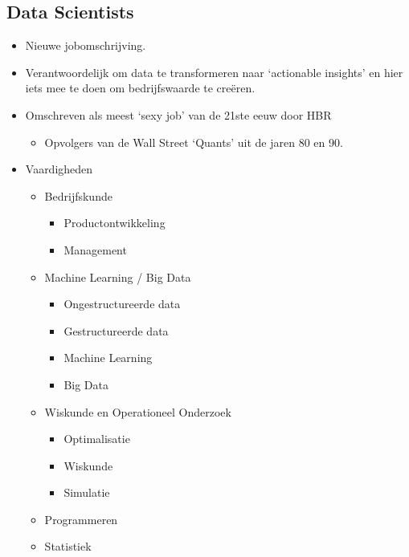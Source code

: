 \documentclass[]{tufte-book}
\providecommand{\tightlist}{%
  \setlength{\itemsep}{0pt}\setlength{\parskip}{0pt}}
\begin{document}
\hypertarget{data-scientists}{%
\subsection{Data Scientists}\label{data-scientists}}

\begin{itemize}
\tightlist
\item
  Nieuwe jobomschrijving.
\item
  Verantwoordelijk om data te transformeren naar `actionable insights' en hier iets mee te doen om bedrijfswaarde te creëren.
\item
  Omschreven als meest `sexy job' van de 21ste eeuw door HBR

  \begin{itemize}
  \tightlist
  \item
    Opvolgers van de Wall Street `Quants' uit de jaren 80 en 90.
  \end{itemize}
\item
  Vaardigheden

  \begin{itemize}
  \tightlist
  \item
    Bedrijfskunde

    \begin{itemize}
    \tightlist
    \item
      Productontwikkeling
    \item
      Management
    \end{itemize}
  \item
    Machine Learning / Big Data

    \begin{itemize}
    \tightlist
    \item
      Ongestructureerde data
    \item
      Gestructureerde data
    \item
      Machine Learning
    \item
      Big Data
    \end{itemize}
  \item
    Wiskunde en Operationeel Onderzoek

    \begin{itemize}
    \tightlist
    \item
      Optimalisatie
    \item
      Wiskunde
    \item
      Simulatie
    \end{itemize}
  \item
    Programmeren
  \item
    Statistiek


\end{itemize}
\end{itemize}
\end{document}
